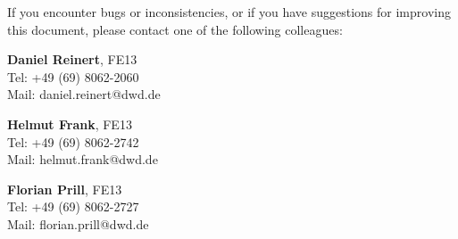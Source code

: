 \vfill
If you encounter bugs or inconsistencies, or if you have suggestions for improving this document, 
please contact one of the following colleagues:

\begin{note}
\begin{minipage}{\textwidth}
\centering
\begin{minipage}{0.32\textwidth}
 \textbf{Daniel Reinert}, FE13 \\
 Tel: +49 (69) 8062-2060 \\ 
 Mail: daniel.reinert@dwd.de
\end{minipage}
\begin{minipage}{0.32\textwidth}
 \textbf{Helmut Frank}, FE13\\
 Tel: +49 (69) 8062-2742 \\ 
 Mail: helmut.frank@dwd.de
\end{minipage}
\begin{minipage}{0.32\textwidth}
 \textbf{Florian Prill}, FE13 \\
 Tel: +49 (69) 8062-2727 \\ 
 Mail: florian.prill@dwd.de
\end{minipage}
\end{minipage}
\end{note}  